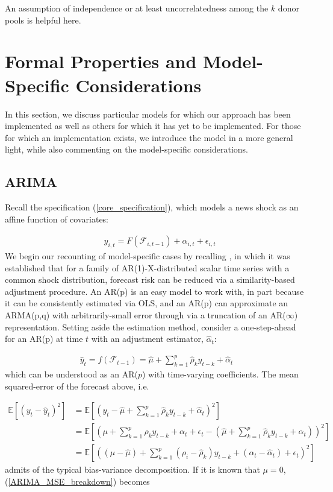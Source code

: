 \documentclass[11pt]{article}
\def\E{\mathbb{E}} %
\theoremstyle{definition}
\begin{document}
An assumption of independence or at least uncorrelatedness among the $k$ donor pools is helpful here.

\section{Formal Properties and Model-Specific Considerations}\label{special_cases}

In this section, we discuss particular models for which our approach has been implemented as well as others for which it has yet to be implemented.  For those for which an implementation exists, we introduce the model in a more general light, while also commenting on the model-specific considerations.


\subsection{ARIMA}\label{ARIMA}
Recall the specification (\ref{core_specification}), which models a news shock as an affine function of covariates:

\begin{align*}
  &y_{i,t} = F(\mathcal{F}_{i,t-1}) + \alpha_{i,t} + \epsilon_{i,t}
\end{align*}
We begin our recounting of model-specific cases by recalling \cite{lin2021minimizing}, in which it was established that for a family of AR(1)-X-distributed scalar time series with a common shock distribution, forecast risk can be reduced via a similarity-based adjustment procedure.  An AR(p) is an easy model to work with, in part because it can be consistently estimated via OLS, and an AR(p) can approximate an ARMA(p,q) with arbitrarily-small error through via a truncation of an AR($\infty$) representation.  Setting aside the estimation method, consider a one-step-ahead for an AR(p) at time $t$ with an adjustment estimator, $\hat\alpha_{t}$:

\begin{align}
\hat{y}_{t} = f(\mathcal{F}_{t-1}) = \hat\mu + \sum^{p}_{k=1}\hat\rho_{k}y_{t-k} + \hat{\alpha}_{t}
\end{align}
which can be understood as an AR($p$) with time-varying coefficients.  The mean squared-error of the forecast above, i.e.

\begin{align}
  \E[(y_{t}-\hat{y}_{t})^{2}] &= \E[(y_{t} - \hat\mu + \sum^{p}_{k=1}\hat\rho_{k}y_{t-k} + \hat{\alpha}_{t})^{2}]\\
  &= \E[(\mu + \sum^{p}_{k=1}\rho_{k}y_{t-k} + \alpha_{t} + \epsilon_{t}  - (\hat\mu + \sum^{p}_{k=1}\hat\rho_{k}y_{t-k} + \hat{\alpha}_{t}))^{2}] \\
  &= \E[((\mu - \hat\mu) + \sum^{p}_{k=1}(\rho_{i}-\hat\rho_{k})y_{t-k} + (\alpha_{t} - \hat{\alpha}_{t}) + \epsilon_{t} )^{2}]\label{ARIMA_MSE_breakdown}
  \end{align}
admits of the typical bias-variance decomposition.  If it is known that $\mu = 0$, (\ref{ARIMA_MSE_breakdown}) becomes
\end{document}
